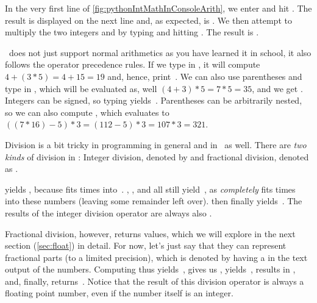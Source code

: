 In the very first line of \cref{fig:pythonIntMathInConsoleArith}, we enter \pythonIdx{+} and hit \keys{\enter}.
The result is displayed on the next line and, as expected, is .
We then attempt to multiply the two integers  and  by typing  and hitting \keys{\enter}.
The result is .

\python\ does not just support normal arithmetics as you have learned it in school, it also follows the operator precedence rules.
If we type in , it will compute $4+(3*5)=4+15=19$\pythonIdx{(}\pythonIdx{)} and, hence, print~.
We can also use parentheses and type in , which will be evaluated as, well $(4+3)*5=7*5=35$, and we get .
Integers can be signed, so typing \pythonIdx{-} yields~.
Parentheses can be arbitrarily nested, so we can also compute , which evaluates to $((7 * 16) - 5) * 3 = (112-5)*3=107*3=321$\pythonIdx{(}\pythonIdx{)}.

Division is a bit tricky in programming in general and in \python\ as well.
There are \emph{two kinds} of division in \python: Integer division, denoted by \pythonilIdx{//} and fractional division, denoted as \pythonilIdx{/}.

 yields , because  fits  times into~.
, , and  all still yield~, as  \emph{completely} fits  times into these numbers (leaving some remainder left over).
 then finally yields~.
The results of the integer division operator \pythonilIdx{//} are always also .

Fractional division, however, returns  values, which we will explore in the next section (\cref{sec:float}) in detail.
For now, let's just say that they can represent fractional parts (to a limited precision), which is denoted by having a  in the text output of the numbers.
Computing  thus yields~,  gives us ,  yields~,  results in , and, finally,  returns~.
Notice that the result of this division operator is always a floating point number, even if the number itself is an integer.

